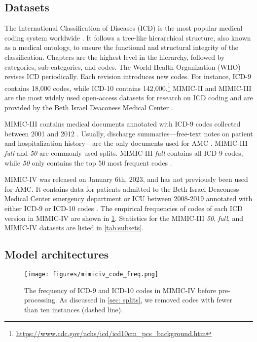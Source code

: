 \documentclass[anonymous=false, sigconf=true, review=false, natbib=true]{acmart}
\begin{document}
\subsection{Datasets}
\label{sec:dataset}
The International Classification of Diseases (ICD) is the most popular medical coding system worldwide \cite{tengReviewDeepNeural2022}. It follows a tree-like hierarchical structure, also known as a medical ontology, to ensure the functional and structural integrity of the classification. Chapters are the highest level in the hierarchy, followed by categories, sub-categories, and codes. The World Health Organization (WHO) revises ICD periodically. Each revision introduces new codes. For instance, ICD-9 contains 18,000 codes, while ICD-10 contains 142,000.\footnote{\url{https://www.cdc.gov/nchs/icd/icd10cm_pcs_background.htm}} MIMIC-II and MIMIC-III are the most widely used open-access datasets for research on ICD coding and are provided by the Beth Israel Deaconess Medical Center \cite{tengReviewDeepNeural2022, johnsonMIMICIIIFreelyAccessible2016, leeOpenaccessMIMICIIDatabase2011}. 
 
MIMIC-III contains medical documents annotated with ICD-9 codes collected between 2001 and 2012 \cite{johnsonMIMICIIIFreelyAccessible2016}. Usually, discharge summaries---free-text notes on patient and hospitalization history---are the only documents used for AMC \cite{tengReviewDeepNeural2022}. MIMIC-III \textit{full} and \textit{50} are commonly used splits. MIMIC-III \textit{full} contains all ICD-9 codes, while \textit{50} only contains the top 50 most frequent codes \cite{mullenbachExplainablePredictionMedical2018, shiAutomatedICDCoding2018}. 


MIMIC-IV was released on January 6th, 2023, and has not previously been used for AMC. It contains data for patients admitted to the Beth Israel Deaconess Medical Center emergency department or ICU between 2008-2019  annotated with either ICD-9 or ICD-10 codes \cite{johnsonMIMICIVFreelyAccessible2023}. The empirical frequencies of codes of each ICD version in MIMIC-IV are shown in \cref{fig:mimiciv_code_dist}.  
Statistics for the MIMIC-III \textit{50}, \textit{full}, and MIMIC-IV datasets are listed in \cref{tab:subsets}.




\subsection{Model architectures}

\begin{figure}[b]
    \centering
    \texttt{[image: figures/mimiciv\_code\_freq.png]}
    \caption{The frequency of ICD-9 and ICD-10 codes in MIMIC-IV before pre-processing. As discussed in \cref{sec: splits}, we removed codes with fewer than ten instances (dashed line).}
    \label{fig:mimiciv_code_dist}
\end{figure}
\end{document}
